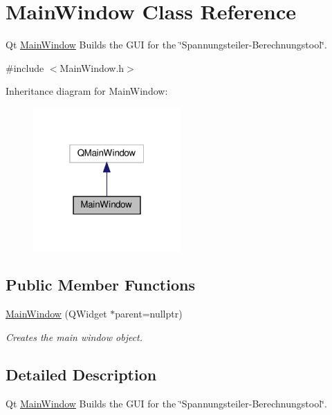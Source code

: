 \hypertarget{classMainWindow}{}\section{Main\+Window Class Reference}
\label{classMainWindow}


Qt \hyperlink{classMainWindow}{Main\+Window} Builds the G\+UI for the \char`\"{}\+Spannungsteiler-\/\+Berechnungstool\char`\"{}.  




{\ttfamily \#include $<$Main\+Window.\+h$>$}



Inheritance diagram for Main\+Window\+:\nopagebreak
\begin{figure}[H]
\begin{center}
\leavevmode
\includegraphics[width=160pt]{classMainWindow__inherit__graph}
\end{center}
\end{figure}
\subsection*{Public Member Functions}
\begin{DoxyCompactItemize}
\item 
\hyperlink{classMainWindow_a996c5a2b6f77944776856f08ec30858d}{Main\+Window} (Q\+Widget $\ast$parent=nullptr)
\begin{DoxyCompactList}\small\item\em Creates the main window object. \end{DoxyCompactList}\end{DoxyCompactItemize}


\subsection{Detailed Description}
Qt \hyperlink{classMainWindow}{Main\+Window} Builds the G\+UI for the \char`\"{}\+Spannungsteiler-\/\+Berechnungstool\char`\"{}. 


